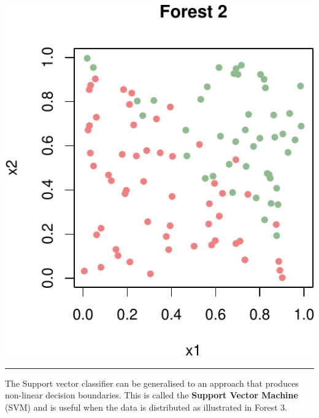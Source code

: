 \documentclass[]{article}
\begin{document}
\includegraphics{9SVM_files/figure-latex/unnamed-chunk-3-1.pdf}

\begin{center}\rule{0.5\linewidth}{\linethickness}\end{center}

The Support vector classifier can be generalised to an approach that
produces non-linear decision boundaries. This is called the
\textbf{Support Vector Machine} (SVM) and is useful when the data is
distributed as illustrated in Forest 3.
\end{document}
